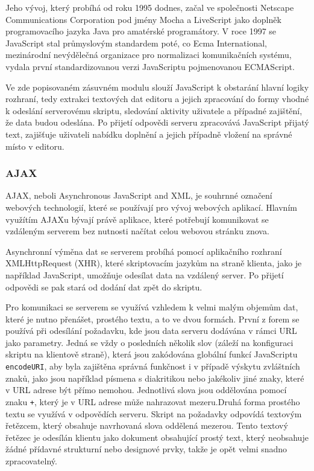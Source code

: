 \documentclass[a4paper,11pt]{article}
\begin{document}
Jeho vývoj, který probíhá od roku 1995 dodnes, začal ve společnosti Netscape Communications Corporation pod jmény Mocha a LiveScript jako doplněk programovacího jazyka Java pro amatérské programátory. V roce 1997 se JavaScript stal průmyslovým standardem poté, co Ecma International, mezinárodní nevýdělečná organizace pro normalizaci komunikačních systému, vydala první standardizovanou verzi JavaScriptu pojmenovanou ECMAScript. %

Ve zde popisovaném zásuvném modulu slouží JavaScript k obstarání hlavní logiky rozhraní, tedy extrakci textových dat editoru a jejich zpracování do formy vhodné k odeslání serverovému skriptu, sledování aktivity uživatele a případné zajištění, že data budou odeslána. Po přijetí odpovědi serveru zpracovává JavaScript přijatý text, zajišťuje uživateli nabídku doplnění a jejich případně vložení na správné místo v editoru. 

\subsubsection{AJAX}

AJAX, neboli Asynchronous JavaScript and XML, je souhrnné označení webových technologií, které se používají pro vývoj webových aplikací. Hlavním využítím AJAXu bývají právě aplikace, které potřebují komunikovat se vzdáleným serverem bez nutnosti načítat celou webovou stránku znova. 

Asynchronní výměna dat se serverem probíhá pomocí aplikačního rozhraní XMLHttpRequest (XHR), které skriptovacím jazykům na straně klienta, jako je například JavaScript, umožňuje odesílat data na vzdálený server. Po přijetí odpovědi se pak stará od dodání dat zpět do skriptu.

Pro komunikaci se serverem se využívá vzhledem k velmi malým objemům dat, které je nutno přenášet, prostého textu, a to ve dvou formách. První z forem se používá při odesílání požadavku, kde jsou data serveru dodávána v rámci URL jako parametry. Jedná se vždy o posledních několik slov (záleží na konfiguraci skriptu na klientově straně), která jsou zakódována globální funkcí JavaScriptu {\tt encodeURI}, aby byla zajištěna správná funkčnost i v případě výskytu zvláštních znaků, jako jsou například písmena s diakritikou nebo jakékoliv jiné znaky, které v URL adrese být přímo nemohou. Jednotlivá slova jsou oddělována pomocí znaku {\tt +}, který je v URL adrese může nahrazovat mezeru.Druhá forma prostého textu se využívá v odpovědích serveru. Skript na požadavky odpovídá textovým řetězcem, který obsahuje navrhovaná slova oddělená mezerou. Tento textový řetězec je odesílán klientu jako dokument obsahující prostý text, který neobsahuje žádné přídavné strukturní nebo designové prvky, takže je opět velmi snadno zpracovatelný.
\end{document}
